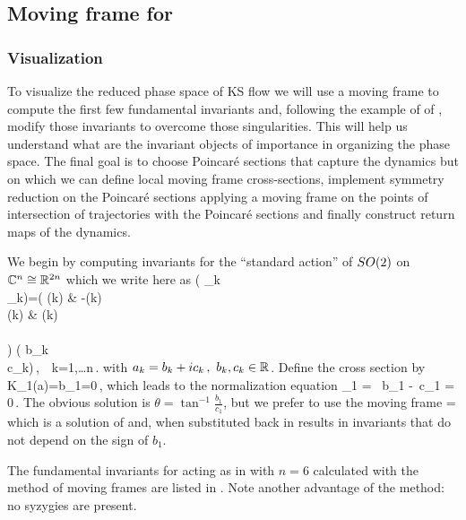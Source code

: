 \subsection{Moving frame for \KSe}


\subsubsection{Visualization}

To visualize the reduced phase space of KS flow we will use a moving frame
to compute the first few fundamental invariants and, following the example of \CLe of ,
modify those invariants to overcome those singularities. This will help us understand what
are the invariant objects of importance in organizing the phase space. The final goal is to choose
Poincar\'e sections that capture the dynamics but on which we can define local moving frame cross-sections, implement symmetry reduction on the Poincar\'e sections applying a moving frame on
the points of intersection of trajectories with the Poincar\'e sections and finally construct
return maps of the dynamics.

We begin by computing invariants for the ``standard action''  of $SO(2)$ on $\mathbb{C}^{n}\cong\mathbb{R}^{2n}$ which we write here as
\beq
	\left( _k \\ _k\earr \right)=\left(
			    			\cos(k\theta) & -\sin(k\theta)\\
						\sin(k\theta) & \cos(k\theta)\\
			   			\earr\\	
						\right) \left( b_k \\ c_k\earr\right)\,,\ \ k=1,\ldots n\,.
	\label{eq:SO2stand}
\eeq
with $a_k=b_k+i c_k\,,\ b_k,c_k\in\mathbb{R}^{}$.  Define the cross section by
\beq
 	K_1(a)=b_1=0\,,
\eeq
which leads to the normalization equation
\beq
	_1 = \cos\theta\, b_1 -\sin\theta\, c_1 = 0\,.
	\label{eq:SO2norm}
\eeq
The obvious solution is $\theta=\tan^{-1}\frac{b_1}{c_1}$, but we prefer to use the moving frame
\beq
	\theta=
\eeq
which is a solution of  and, when substituted back in  results in invariants that do not depend on the sign of $b_1$.

The fundamental invariants for  acting as in  with
$n=6$ calculated with the method of moving frames are listed in . Note another advantage of the method: no syzygies are present.

